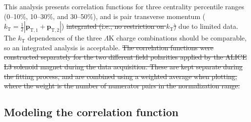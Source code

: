 \documentclass[ALICE,manyauthors]{cernphprep}
\newcommand{\LamK}{$\Lambda$K\xspace}
\providecommand{\DIFaddtex}[1]{{\protect\color{blue}\uwave{#1}}} %
\providecommand{\DIFdeltex}[1]{{\protect\color{red}\sout{#1}}}                      %
\providecommand{\DIFaddbegin}{} %
\providecommand{\DIFaddend}{} %
\providecommand{\DIFdelbegin}{} %
\providecommand{\DIFdelend}{} %
\providecommand{\DIFadd}[1]{\texorpdfstring{\DIFaddtex{#1}}{#1}} %
\providecommand{\DIFdel}[1]{\texorpdfstring{\DIFdeltex{#1}}{}} %
\begin{document}
This analysis presents correlation functions for three centrality percentile ranges (0--10\%, 10--30\%, and 30--50\%), and is \DIFaddbegin \DIFadd{integrated in }\DIFaddend pair transverse momentum ($k_{\mathrm{T}} = \frac{1}{2}|\mathbf{p}_{\mathrm{T,1}}+\mathbf{p}_{\mathrm{T,2}}|$) \DIFdelbegin \DIFdel{integrated (i.e., no restriction on $k_{\mathrm{T}}$) }\DIFdelend due to limited data.
The $k_{\mathrm{T}}$ dependences of the three \LamK charge combinations should be comparable, so an integrated analysis is acceptable.
\DIFdelbegin \DIFdel{The correlation functions were constructed separately for the two different field polarities applied by the ALICE L3 solenoid magnet during the data acquisition.
These are kept separate during the fitting process, and are combined using a weighted average when plotting, where the weight is the number of numerator pairs in the normalization range.
}\DIFdelend 

\subsection{Modeling the correlation function}
\label{sec:ModelingCF}
\end{document}
